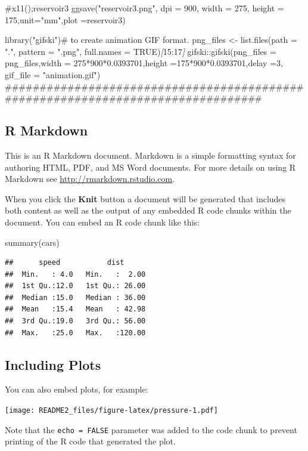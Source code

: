 \documentclass[
]{article}
\newenvironment{Shaded}{\begin{snugshade}}{\end{snugshade}}
\newcommand{\CommentTok}[1]{\textcolor[rgb]{0.56,0.35,0.01}{\textit{#1}}}
\newcommand{\FunctionTok}[1]{\textcolor[rgb]{0.00,0.00,0.00}{#1}}
\newcommand{\NormalTok}[1]{#1}
\newcommand{\OtherTok}[1]{\textcolor[rgb]{0.56,0.35,0.01}{#1}}
\begin{document}
\begin{Shaded}
\begin{Highlighting}[]
\NormalTok{\#x11();reservoir3}
\NormalTok{ggsave("reservoir3.png", dpi = 900,   width = 275,}
\NormalTok{       height = 175,unit="mm",plot =reservoir3)}
       
\NormalTok{library("gifski")\# to create animation GIF format.}
\NormalTok{png\_files \textless{}{-} list.files(path = ".", pattern = ".png", full.names = TRUE)}\CommentTok{[}\OtherTok{15:17}\CommentTok{]}
\NormalTok{gifski::gifski(png\_files = png\_files,width = 275*900*0.0393701,height =175*900*0.0393701,delay =3, gif\_file = "animation.gif")}
\NormalTok{\#\#\#\#\#\#\#\#\#\#\#\#\#\#\#\#\#\#\#\#\#\#\#\#\#\#\#\#\#\#\#\#\#\#\#\#\#\#\#\#\#\#\#\#\#\#\#\#\#\#\#\#\#\#\#\#\#\#\#\#\#\#\#\#\#\#\#\#\#\#\#\#\#\#\#\#\#\#\#\#}
\end{Highlighting}
\end{Shaded}

\hypertarget{r-markdown}{%
\subsection{R Markdown}\label{r-markdown}}

This is an R Markdown document. Markdown is a simple formatting syntax
for authoring HTML, PDF, and MS Word documents. For more details on
using R Markdown see \url{http://rmarkdown.rstudio.com}.

When you click the \textbf{Knit} button a document will be generated
that includes both content as well as the output of any embedded R code
chunks within the document. You can embed an R code chunk like this:

\begin{Shaded}
\begin{Highlighting}[]
\FunctionTok{summary}\NormalTok{(cars)}
\end{Highlighting}
\end{Shaded}

\begin{verbatim}
##      speed           dist       
##  Min.   : 4.0   Min.   :  2.00  
##  1st Qu.:12.0   1st Qu.: 26.00  
##  Median :15.0   Median : 36.00  
##  Mean   :15.4   Mean   : 42.98  
##  3rd Qu.:19.0   3rd Qu.: 56.00  
##  Max.   :25.0   Max.   :120.00
\end{verbatim}

\hypertarget{including-plots}{%
\subsection{Including Plots}\label{including-plots}}

You can also embed plots, for example:

\texttt{[image: README2\_files/figure-latex/pressure-1.pdf]}

Note that the \texttt{echo\ =\ FALSE} parameter was added to the code
chunk to prevent printing of the R code that generated the plot.
\end{document}
